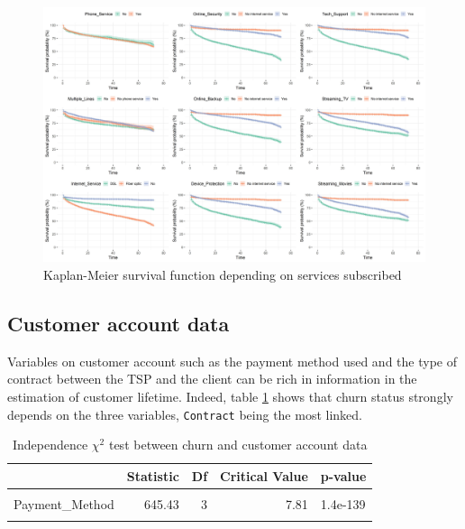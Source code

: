 \documentclass[
]{book}
\begin{document}
\begin{figure}

{\centering \includegraphics[width=75in]{./imgs/services_plot} 

}

\caption{Kaplan-Meier survival function depending on services subscribed}\label{fig:kmservices}
\end{figure}

\hypertarget{customer-account-data}{%
\subsection*{Customer account data}\label{customer-account-data}}

Variables on customer account such as the payment method used and the type of contract between the TSP and the client can be rich in information in the estimation of customer lifetime. Indeed, table \ref{tab:chi2custaccount} shows that churn status strongly depends on the three variables, \texttt{Contract} being the most linked.

\begin{table}[H]

\caption{\label{tab:chi2custaccount}Independence $\chi^2$ test between churn and customer account data}
\centering
\begin{tabular}[t]{lrrrl}
\toprule
  & Statistic & Df & Critical Value & p-value\\
\midrule
\cellcolor{gray!6}{Contract} & \cellcolor{gray!6}{1179.55} & \cellcolor{gray!6}{2} & \cellcolor{gray!6}{5.99} & \cellcolor{gray!6}{7.3e-257}\\
Payment\_Method & 645.43 & 3 & 7.81 & 1.4e-139\\
\cellcolor{gray!6}{Paperless\_Billing} & \cellcolor{gray!6}{256.87} & \cellcolor{gray!6}{1} & \cellcolor{gray!6}{3.84} & \cellcolor{gray!6}{8.2e-58}\\
\bottomrule
\end{tabular}
\end{table}
\end{document}
